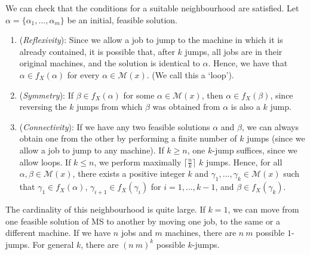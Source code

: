 \documentclass[12pt,a4paper,reqno]{article}
\begin{document}
We can check that the conditions for a suitable neighbourhood are satisfied. Let $\alpha = \{\alpha_1,...,\alpha_m\}$ be an initial, feasible solution.
\begin{enumerate}

\item (\textit{Reflexivity}): Since we allow a job to jump to the machine in which it is already contained, it is possible that, after $k$ jumps, all jobs are in their original machines, and the solution is identical to $\alpha$. Hence, we have that $\alpha \in f_X(\alpha)$ for every $\alpha \in \mathcal{M}(x)$. (We call this a `loop').

\item (\textit{Symmetry}): If $\beta \in f_X(\alpha)$ for some $\alpha \in \mathcal{M}(x)$, then $\alpha \in f_X(\beta)$, since reversing the $k$ jumps from which $\beta$ was obtained from $\alpha$ is also a $k$ jump.

\item (\textit{Connectivity}): If we have any two feasible solutions $\alpha$ and $\beta$, we can always obtain one from the other by performing a finite number of $k$ jumps (since we allow a job to jump to any machine). If $k \geq n$, one $k$-jump suffices, since we allow loops. If $k \leq n$, we perform maximally $\lceil \frac{n}{k} \rceil$ $k$ jumps. Hence, for all $\alpha, \beta \in \mathcal{M}(x)$, there exists a positive integer $k$ and $\gamma_1,...,\gamma_k \in \mathcal{M}(x)$ such that $\gamma_1 \in f_X(\alpha)$, $\gamma_{i+1} \in f_X(\gamma_i)$ for $i=1,...,k-1$, and $\beta \in f_X(\gamma_k)$.

\end{enumerate}

The cardinality of this neighbourhood is quite large. If $k=1$, we can move from one feasible solution of MS to another by moving one job, to the same or a different machine. If we have $n$ jobs and $m$ machines, there are $n \> m$ possible $1$-jumps. For general $k$, there are $(n \> m)^k$ possible $k$-jumps.
\end{document}
